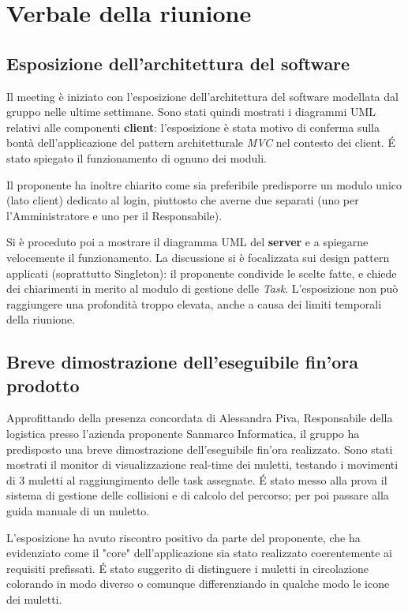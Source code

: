 \section{Verbale della riunione}

\subsection{Esposizione dell'architettura del software}

Il meeting è iniziato con l'esposizione dell'architettura del software modellata dal gruppo nelle ultime settimane. Sono stati quindi mostrati i diagrammi UML relativi alle componenti \textbf{client}: l'esposizione è stata motivo di conferma sulla bontà dell'applicazione del pattern architetturale \textit{MVC} nel contesto dei client. \'E stato spiegato il funzionamento di ognuno dei moduli.

Il proponente ha inoltre chiarito come sia preferibile predisporre un modulo unico (lato client) dedicato al login, piuttosto che averne due separati (uno per l'Amministratore e uno per il Responsabile).

Si è proceduto poi a mostrare il diagramma UML del \textbf{server} e a spiegarne velocemente il funzionamento. La discussione si è focalizzata sui design pattern applicati (soprattutto Singleton): il proponente condivide le scelte fatte, e chiede dei chiarimenti in merito al modulo di gestione delle \textit{Task}. L'esposizione non può raggiungere una profondità troppo elevata, anche a causa dei limiti temporali della riunione.

\subsection{Breve dimostrazione dell'eseguibile fin'ora prodotto}

Approfittando della presenza concordata di Alessandra Piva, Responsabile della logistica presso l'azienda proponente Sanmarco Informatica, il gruppo ha predisposto una breve dimostrazione dell'eseguibile fin'ora realizzato. Sono stati mostrati il monitor di visualizzazione real-time dei muletti, testando i movimenti di 3 muletti al raggiungimento delle task assegnate. \'E stato messo alla prova il sistema di gestione delle collisioni e di calcolo del percorso; per poi passare alla guida manuale di un muletto.

L'esposizione ha avuto riscontro positivo da parte del proponente, che ha evidenziato come il "core" dell'applicazione sia stato realizzato coerentemente ai requisiti prefissati. \'E stato suggerito di distinguere i muletti in circolazione colorando in modo diverso o comunque differenziando in qualche modo le icone dei muletti.

